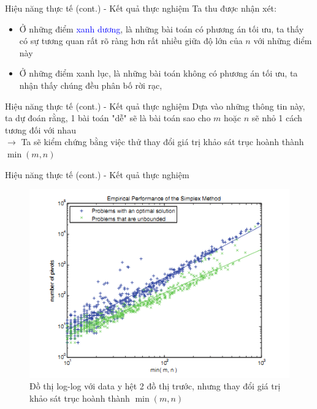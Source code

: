 \documentclass[10pt]{beamer}
\begin{document}
\begin{frame}[fragile]{Hiệu năng thực tế (cont.) - Kết quả thực nghiệm}
Ta thu được nhận xét:
\begin{itemize}
\item Ở những điểm \textcolor{blue}{xanh dương}, là những bài toán có phương án tối ưu, ta thấy có sự tương quan rất rõ ràng hơn rất nhiều giữa độ lớn của $n$ với những điểm này
\item Ở những điểm \textcolor{codegreen}{xanh lục}, là những bài toán không có phương án tối ưu, ta nhận thấy chúng đều phân bố rời rạc,
\end{itemize}
\end{frame}

\begin{frame}[fragile]{Hiệu năng thực tế (cont.) - Kết quả thực nghiệm}
Dựa vào những thông tin này, ta dự đoán rằng, 1 bài toán "dễ" sẽ là bài toán sao cho $m$ hoặc $n$ sẽ nhỏ 1 cách tương đối với nhau \\
$\rightarrow$ Ta sẽ kiểm chứng bằng việc thử thay đổi giá trị khảo sát trục hoành thành $\min(m, n)$ \\
\end{frame}

\begin{frame}[fragile]{Hiệu năng thực tế (cont.) - Kết quả thực nghiệm}
\begin{figure}
\includegraphics[scale=.5]{img/plot_3.png}
\caption{Đồ thị log-log với data y hệt 2 đồ thị trước, nhưng thay đổi giá trị khảo sát trục hoành thành $\min(m, n)$}
\end{figure}
\end{frame}
\end{document}
